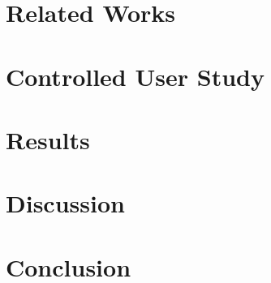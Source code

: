 \documentclass[conference, draftclsnofoot, draft]{IEEEtran}
\begin{document}
\section{Related Works}
\label{sec:related_works}



\section{Controlled User Study}
\label{sec:methodology}

\section{Results}
\label{sec:results}

\section{Discussion}
\label{sec:discussion}

\section{Conclusion}
\label{sec:conclusion}




\end{document}
